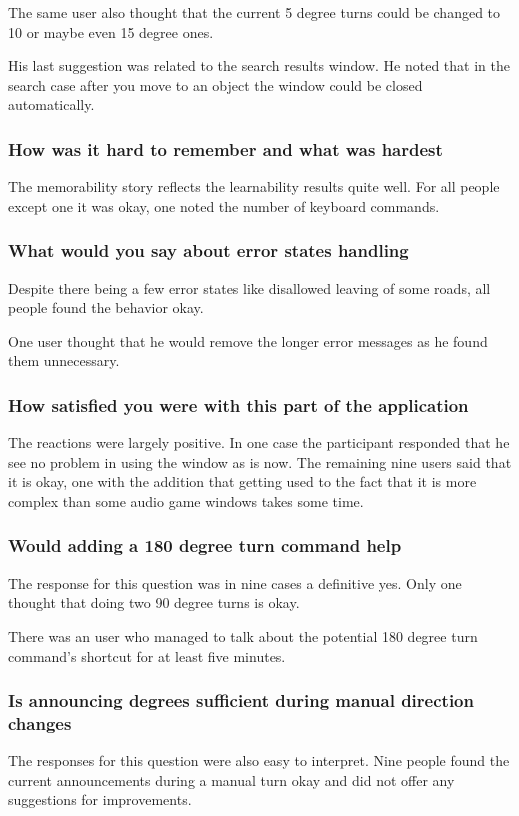 \documentclass[nolof,digital]{fithesis3}
\begin{document}
The same user also thought that the current 5 degree turns could be changed to 10 or maybe even 15 degree ones.

His last suggestion was related to the search results window. He noted that in the search case after you move to an object the window could be closed automatically.
\subsubsection{How was it hard to remember and what was hardest}
The memorability story reflects the learnability results quite well. For all people except one it was okay, one noted the number of keyboard commands.
\subsubsection{What would you say about error states handling}
Despite there being a few error states like disallowed leaving of some roads, all people found the behavior okay.

One user thought that he would remove the longer error messages as he found them unnecessary.
\subsubsection{How satisfied you were with this part of the application}
The reactions were largely positive. In one case the participant responded that he see no problem in using the window as is now. The remaining nine users said that it is okay, one with the addition that getting used to the fact that it is more complex than some audio game windows takes some time.
\subsubsection{Would adding a 180 degree turn command help}
The response for this question was in nine cases a definitive yes. Only one thought that doing two 90 degree turns is okay.

There was an user who managed to talk about the potential 180 degree turn command's shortcut for at least five minutes.
\subsubsection{Is announcing degrees sufficient during manual direction changes}
The responses for this question were also easy to interpret. Nine people found the current announcements during a manual turn okay and did not offer any suggestions for improvements.
\end{document}
